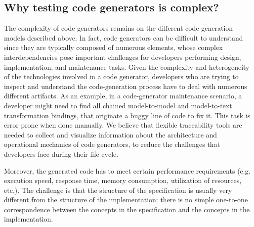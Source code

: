 \subsection{Why testing code generators is complex?}



The complexity of code generators remains on the different code generation models described above.
In fact, code generators can be difficult to understand since they are typically composed of numerous elements, whose complex interdependencies pose important challenges for developers performing design, implementation, and maintenance tasks. 
Given the complexity and heterogeneity of the technologies involved in a code generator, developers who are trying to inspect and understand the code-generation process have to deal with numerous different artifacts. As an example, in a code-generator maintenance scenario, a developer might need to find all chained model-to-model and model-to-text transformation bindings, that originate a buggy line of code to fix it. This task is error prone when done manually. We believe that flexible traceability tools are needed to collect and visualize information about the architecture and operational mechanics of code generators, to reduce the challenges that developers face during their life-cycle\cite{guana2015developers}.

Moreover, the generated code has to meet certain performance requirements (e.g. execution speed, response time, memory consumption, utilization of resources, etc.). The challenge is that the structure of the specification is usually very different from the structure of the implementation: there is no simple one-to-one correspondence between the concepts in the specification and the concepts in the implementation. 

